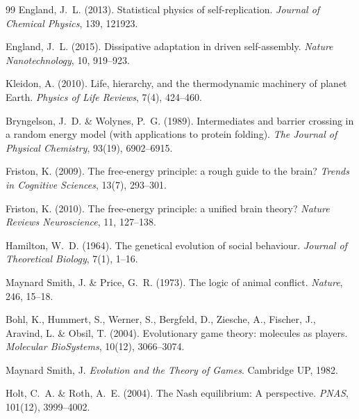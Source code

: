 \documentclass[12pt,a4paper]{article}
\theoremstyle{remark}
\begin{document}
\begin{thebibliography}{99}
England, J.~L. (2013).
\newblock Statistical physics of self-replication.
\newblock \textit{Journal of Chemical Physics}, 139, 121923.

England, J.~L. (2015).
\newblock Dissipative adaptation in driven self-assembly.
\newblock \textit{Nature Nanotechnology}, 10, 919--923.

Kleidon, A. (2010).
\newblock Life, hierarchy, and the thermodynamic machinery of planet Earth.
\newblock \textit{Physics of Life Reviews}, 7(4), 424--460.

Bryngelson, J.~D. \& Wolynes, P.~G. (1989).
\newblock Intermediates and barrier crossing in a random energy model (with applications to protein folding).
\newblock \textit{The Journal of Physical Chemistry}, 93(19), 6902--6915.

Friston, K. (2009).
\newblock The free-energy principle: a rough guide to the brain?
\newblock \textit{Trends in Cognitive Sciences}, 13(7), 293--301.

Friston, K. (2010).
\newblock The free-energy principle: a unified brain theory?
\newblock \textit{Nature Reviews Neuroscience}, 11, 127--138.

Hamilton, W.~D. (1964).
\newblock The genetical evolution of social behaviour.
\newblock \textit{Journal of Theoretical Biology}, 7(1), 1--16.

Maynard Smith, J. \& Price, G.~R. (1973).
\newblock The logic of animal conflict.
\newblock \textit{Nature}, 246, 15--18.

Bohl, K., Hummert, S., Werner, S., Bergfeld, D., Ziesche, A., Fischer, J., Aravind, L. \& Obsil, T. (2004).
\newblock Evolutionary game theory: molecules as players.
\newblock \textit{Molecular BioSystems}, 10(12), 3066--3074.

Maynard Smith, J.
\newblock \textit{Evolution and the Theory of Games}.
\newblock Cambridge UP, 1982.

Holt, C.~A. \& Roth, A.~E. (2004).
\newblock The Nash equilibrium: A perspective.
\newblock \textit{PNAS}, 101(12), 3999--4002.


\end{thebibliography}
\end{document}

